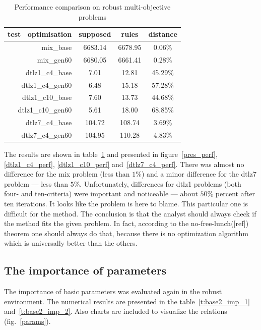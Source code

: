 \begin{table}
  \centering
  \caption{Performance comparison on robust multi-objective problems}
  \label{t:perf-comp}
  \begin{tabular}{r c c c}
    \hline
    test \ optimisation & supposed & rules & distance \\
    \hline
    \hline
    mix\_base & 6683.14 & 6678.95 & 0.06\% \\
    mix\_gen60 & 6680.05 & 6661.41 & 0.28\% \\
    dtlz1\_c4\_base & 7.01 & 12.81 & 45.29\% \\
    dtlz1\_c4\_gen60 & 6.48 & 15.18 & 57.28\% \\
    dtlz1\_c10\_base & 7.60 & 13.73 & 44.68\% \\
    dtlz1\_c10\_gen60 & 5.61 & 18.00 & 68.85\% \\
    dtlz7\_c4\_base & 104.72 & 108.74 & 3.69\% \\
    dtlz7\_c4\_gen60 & 104.95 & 110.28 & 4.83\% \\
    \hline
  \end{tabular}
\end{table}

The results are shown in table~\ref{t:perf-comp} and presented in
figure~\ref{pres_perf}, \ref{dtlz1_c4_perf}, \ref{dtlz1_c10_perf}
and~\ref{dtlz7_c4_perf}. There was almost no difference for the mix problem
(less than $1\%$) and a minor difference for the dtlz7 problem --- less than
$5\%$. Unfortunately, differences for dtlz1 problems (both four- and
ten-criteria) were important and noticeable --- about $50\%$ percent after ten
iterations. It looks like the problem is here to blame. This particular one is
difficult for the method. The conclusion is that the analyst should always
check if the method fits the given problem. In fact, according to the
no-free-lunch([ref]) theorem one should always do that, because there is no
optimization algorithm which is universally better than the others.

\clearpage{}

\subsection{The importance of parameters}

The importance of basic parameters was evaluated again in the robust
environment. The numerical results are presented in the
table~\ref{t:base2_imp_1} and~\ref{t:base2_imp_2}. Also charts are included to
visualize the relations (fig.~\ref{params}).

